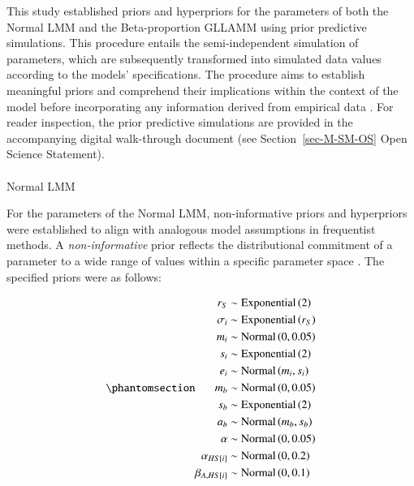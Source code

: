 \documentclass[
  authoryear,
  preprint,
  1p]{elsarticle}
\makeatletter
\let\oldparagraph\paragraph
\renewcommand{\paragraph}{
    \@ifstar
      \xxxParagraphStar
      \xxxParagraphNoStar
  }
\newcommand{\xxxParagraphStar}[1]{\oldparagraph*{#1}\mbox{}}
\newcommand{\xxxParagraphNoStar}[1]{\oldparagraph{#1}\mbox{}}
\makeatother
\begin{document}
This study established priors and hyperpriors for the parameters of both
the Normal LMM and the Beta-proportion GLLAMM using prior predictive
simulations. This procedure entails the semi-independent simulation of
parameters, which are subsequently transformed into simulated data
values according to the models' specifications. The procedure aims to
establish meaningful priors and comprehend their implications within the
context of the model before incorporating any information derived from
empirical data \citep{McElreath_2020}. For reader inspection, the prior
predictive simulations are provided in the accompanying digital
walk-through document (see Section~\ref{sec-M-SM-OS} Open Science
Statement).

\paragraph{Normal LMM}\label{sec-M-SM-P-NLMM}

For the parameters of the Normal LMM, non-informative priors and
hyperpriors were established to align with analogous model assumptions
in frequentist methods. A \emph{non-informative} prior reflects the
distributional commitment of a parameter to a wide range of values
within a specific parameter space \citep{Everitt_et_al_2010}. The
specified priors were as follows:

\begin{equation}\phantomsection\label{eq-normal-LMM-priors}{
\begin{aligned}
r_{S} &\sim \text{Exponential}\left( 2 \right) \\ 
\sigma_{i} &\sim \text{Exponential}\left( r_{S} \right) \\
m_{i} &\sim \text{Normal} \left( 0, 0.05 \right) \\
s_{i} &\sim \text{Exponential} \left( 2 \right) \\
e_{i} &\sim \text{Normal} \left( m_{i}, s_{i} \right) \\
m_{b} &\sim \text{Normal} \left( 0, 0.05 \right) \\
s_{b} &\sim \text{Exponential} \left( 2 \right) \\
a_{b} &\sim \text{Normal} \left( m_{b}, s_{b} \right) \\
\alpha &\sim \text{Normal} \left( 0, 0.05 \right) \\
\alpha_{HS[i]} &\sim \text{Normal} \left( 0, 0.2 \right) \\
\beta_{A,HS[i]} &\sim \text{Normal} \left( 0, 0.1 \right)
\end{aligned} 
}\end{equation}
\end{document}
